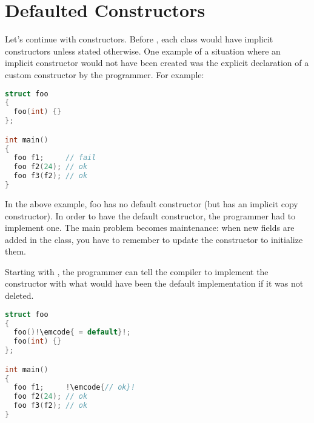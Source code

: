 \section{Defaulted Constructors}

Let's continue with constructors. Before , each class would have
implicit constructors unless stated otherwise. One example of a
situation where an implicit constructor would not have been created
was the explicit declaration of a custom constructor by the
programmer. For example:

\begin{lstlisting}[language=c++]
struct foo
{
  foo(int) {}
};

int main()
{
  foo f1;     // fail
  foo f2(24); // ok
  foo f3(f2); // ok
}
\end{lstlisting}

In the above example, foo has no default constructor (but has an
implicit copy constructor). In order to have the default constructor,
the programmer had to implement one. The main problem becomes
maintenance: when new fields are added in the class, you have to
remember to update the constructor to initialize them.

Starting with , the programmer can tell the compiler to
implement the constructor with what would have been the default
implementation if it was not deleted.

\begin{lstlisting}[language=c++,escapechar=!]
struct foo
{
  foo()!\emcode{ = default}!;
  foo(int) {}
};

int main()
{
  foo f1;     !\emcode{// ok}!
  foo f2(24); // ok
  foo f3(f2); // ok
}
\end{lstlisting}
